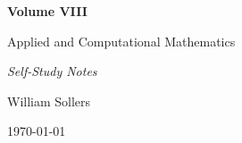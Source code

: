 \begin{titlepage}
\centering

\vspace*{5cm}

{\Huge\bfseries Volume VIII\par}

\vspace{0.5cm}

{\LARGE Applied and Computational Mathematics\par}

\vspace{0.5cm}

{\large\itshape Self-Study Notes\par}

\vfill

{\large William Sollers\par}

\vspace{0.5cm}

{\large \today\par}

\end{titlepage}

